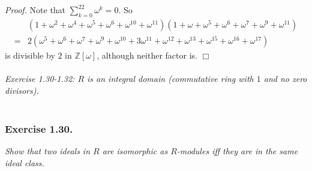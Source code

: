 \documentclass{article}
\begin{document}
\emph{Proof.}
Note that $\sum_{k=0}^{22} \omega^k = 0$.
So
\begin{align*}
&(1+\omega^2+\omega^4+\omega^5+\omega^6+\omega^{10}+\omega^{11})
(1+\omega+\omega^5+\omega^6+\omega^7+\omega^9+\omega^{11}) \\
=& 2(\omega^5+\omega^6+\omega^7+\omega^9+\omega^{10}+3\omega^{11}
+\omega^{12}+\omega^{13}+\omega^{15}+\omega^{16}+\omega^{17})
\end{align*}
is divisible by $2$ in $\mathbb{Z}[\omega]$,
although neither factor is.
$\Box$ \\\\






\emph{Exercise 1.30-1.32: $R$ is an integral domain
(commutative ring with $1$ and no zero divisors).} \\\\



\subsubsection*{Exercise 1.30.}
\emph{Show that two ideals in $R$ are isomorphic as $R$-modules
iff they are in the same ideal class.} \\
\end{document}
